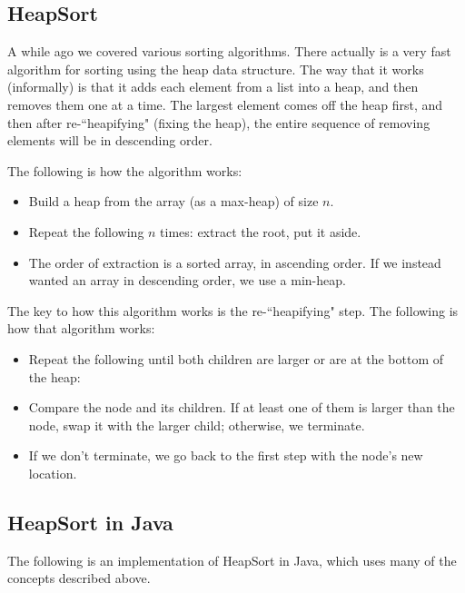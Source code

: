 \subsection*{HeapSort}
A while ago we covered various sorting algorithms. There actually is a very fast algorithm for sorting using the heap data structure. The way that it works (informally) is that it adds each element from a list into a heap, and then removes them one at a time. The largest element comes off the heap first, and then after re-``heapifying" (fixing the heap), the entire sequence of removing elements will be in descending order.

\par The following is how the algorithm works:
\begin{itemize}
\item Build a heap from the array (as a max-heap) of size $n$.
\item Repeat the following $n$ times: extract the root, put it aside.
\item The order of extraction is a sorted array, in ascending order. If we instead wanted an array in descending order, we use a min-heap.
\end{itemize}

\par The key to how this algorithm works is the re-``heapifying" step. The following is how that algorithm works:
\begin{itemize}
\item Repeat the following until both children are larger or are at the bottom of the heap:
\item Compare the node and its children. If at least one of them is larger than the node, swap it with the larger child; otherwise, we terminate. 
\item If we don't terminate, we go back to the first step with the node's new location.
\end{itemize}

\subsection*{HeapSort in Java}
The following is an implementation of HeapSort in Java, which uses many of the concepts described above.

